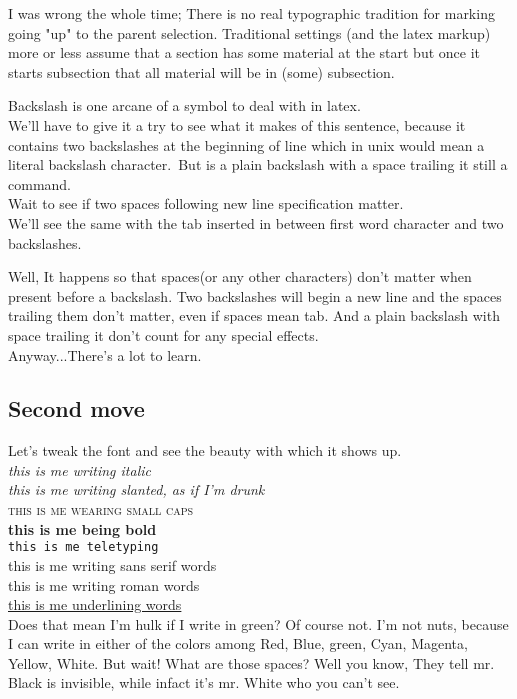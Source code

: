 \documentclass[a4paper,12pt]{article}
\begin{document}
I was wrong the whole time; There is no real typographic tradition for marking going "up" to the parent selection. Traditional settings (and the latex markup) more or less assume that a section has some material at the start but once it starts subsection that all material will be in (some) subsection.

Backslash is one arcane of a symbol to deal with in latex.\\ We'll have to give it a try to see what it makes of this sentence, because it contains two backslashes at the beginning of line which in unix would mean a literal backslash character.\ But is a plain backslash with a space trailing it still a command. \\  Wait to see if two spaces following new line specification matter. \\	We'll see the same with the tab inserted in between first word character and two backslashes.

Well, It happens so that spaces(or any other characters) don't matter when present before a backslash. Two backslashes will begin a new line and the spaces trailing them don't matter, even if spaces mean tab. And a plain backslash with space trailing it don't count for any special effects.\\

Anyway...There's a lot to learn.

\subsection{Second move}
\label{second-method}

Let's tweak the font and see the beauty with which it shows up. \\
\textit{this is me writing italic} \\
\textsl{this is me writing slanted, as if I'm drunk} \\
\textsc{this is me wearing small caps} \\
\textbf{this is me being bold} \\
\texttt{this is me teletyping} \\
\textsf{this is me writing sans serif words} \\
\textrm{this is me writing roman words} \\
\underline{this is me underlining words} \\

{\color{green}Does that mean I'm hulk if I write in green? Of course not. I'm not {\color{red}nuts}, because I can write in either of the colors among {\color{red}Red}, {\color{blue}Blue}, {\color{green}green}, {\color{cyan}Cyan}, {\color{magenta}Magenta}, {\color{yellow}Yellow}, {\color{white}White}. But wait! What are those spaces? Well you know, They tell mr. Black is invisible, while infact it's mr. White who you can't see.}
\end{document}
